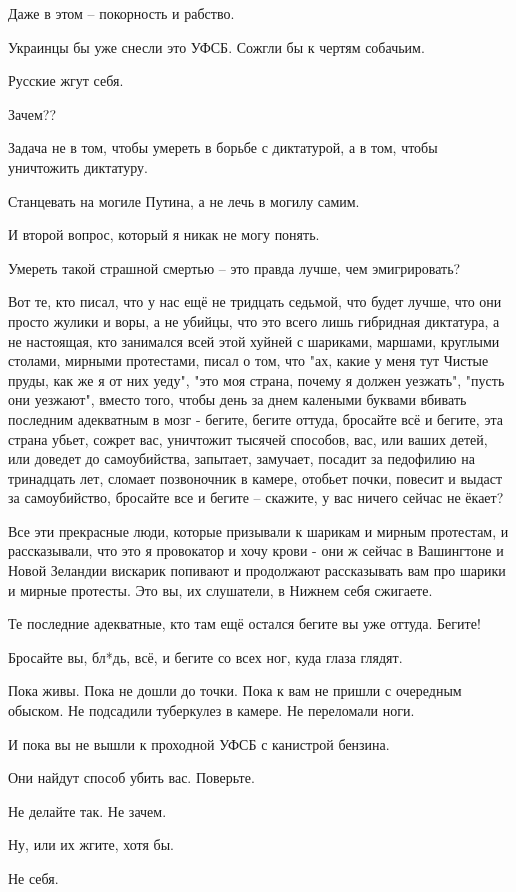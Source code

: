 Даже в этом – покорность и рабство.

Украинцы бы уже снесли это УФСБ. Сожгли бы к чертям собачьим.

Русские жгут себя.

Зачем??

Задача не в том, чтобы умереть в борьбе с диктатурой, а в том, чтобы уничтожить
диктатуру.

Станцевать на могиле Путина, а не лечь в могилу самим.

И второй вопрос, который я никак не могу понять.

Умереть такой страшной смертью – это правда лучше, чем эмигрировать?

Вот те, кто писал, что у нас ещё не тридцать седьмой, что будет лучше, что они
просто жулики и воры, а не убийцы, что это всего лишь гибридная диктатура, а не
настоящая, кто занимался всей этой хуйней с шариками, маршами, круглыми
столами, мирными протестами, писал о том, что "ах, какие у меня тут Чистые
пруды, как же я от них уеду", "это моя страна, почему я должен уезжать", "пусть
они уезжают", вместо того, чтобы день за днем калеными буквами вбивать
последним адекватным в мозг - бегите, бегите оттуда, бросайте всё и бегите, эта
страна убьет, сожрет вас, уничтожит тысячей способов, вас, или ваших детей, или
доведет до самоубийства, запытает, замучает, посадит за педофилию на тринадцать
лет, сломает позвоночник в камере, отобьет почки, повесит и выдаст за
самоубийство, бросайте все и бегите – скажите, у вас ничего сейчас не ёкает?

Все эти прекрасные люди, которые призывали к шарикам и мирным протестам, и
рассказывали, что это я провокатор и хочу крови - они ж сейчас в Вашингтоне и
Новой Зеландии вискарик попивают и продолжают рассказывать вам про шарики и
мирные протесты. Это вы, их слушатели, в Нижнем себя сжигаете.

Те последние адекватные, кто там ещё остался бегите вы уже оттуда. Бегите!

Бросайте вы, бл*дь, всё, и бегите со всех ног, куда глаза глядят.

Пока живы. Пока не дошли до точки. Пока к вам не пришли с очередным обыском. Не
подсадили туберкулез в камере. Не переломали ноги.

И пока вы не вышли к проходной УФСБ с канистрой бензина.

Они найдут способ убить вас. Поверьте.

Не делайте так. Не зачем.

Ну, или их жгите, хотя бы.

Не себя.

